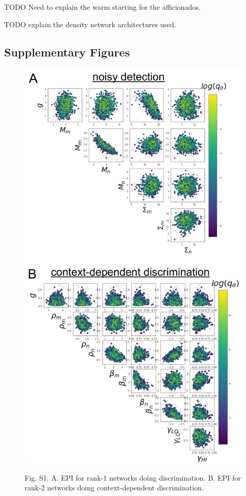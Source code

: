 \documentclass[11pt]{article}
\begin{document}
TODO Need to explain the warm starting for the afficionados.

TODO explain the density network architectures used.

\subsection{Supplementary Figures}

\begin{figure}
\begin{center}
\includegraphics[scale=0.5]{figures/figS1/figS1.pdf}
\end{center}
Fig. S1: A. EPI for rank-1 networks doing discrimination. B. EPI for rank-2 networks doing context-dependent discrimination.
\end{figure}
\end{document}
